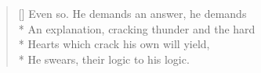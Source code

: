 \label{ch:lear_bh}
\settowidth{\versewidth}{An explanation, cracking thunder and the hard}
\begin{verse}[\versewidth]
 Even so. He demands an answer, he demands\\*
An explanation, cracking thunder and the hard\\*
Hearts which crack his own will yield,\\*
He swears, their logic to his logic.
\end{verse}

